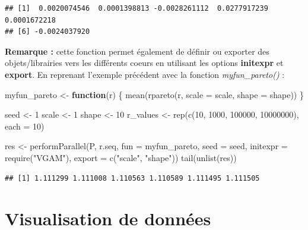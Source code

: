 \documentclass[
]{book}
\newenvironment{Shaded}{\begin{snugshade}}{\end{snugshade}}
\newcommand{\AttributeTok}[1]{\textcolor[rgb]{0.77,0.63,0.00}{#1}}
\newcommand{\ControlFlowTok}[1]{\textcolor[rgb]{0.13,0.29,0.53}{\textbf{#1}}}
\newcommand{\DecValTok}[1]{\textcolor[rgb]{0.00,0.00,0.81}{#1}}
\newcommand{\FunctionTok}[1]{\textcolor[rgb]{0.00,0.00,0.00}{#1}}
\newcommand{\NormalTok}[1]{#1}
\newcommand{\OtherTok}[1]{\textcolor[rgb]{0.56,0.35,0.01}{#1}}
\newcommand{\StringTok}[1]{\textcolor[rgb]{0.31,0.60,0.02}{#1}}
\theoremstyle{definition}
\theoremstyle{definition}
\theoremstyle{definition}
\theoremstyle{definition}
\theoremstyle{remark}
\begin{document}
\begin{verbatim}
## [1]  0.0020074546  0.0001398813 -0.0028261112  0.0277917239  0.0001672218
## [6] -0.0024037920
\end{verbatim}

\textbf{Remarque :} cette fonction permet également de définir ou exporter des objets/librairies vers les différents coeurs en utilisant les options \textbf{initexpr} et \textbf{export}. En reprenant l'exemple précédent avec la fonction \emph{myfun\_pareto()} :

\begin{Shaded}
\begin{Highlighting}[]
\NormalTok{myfun\_pareto }\OtherTok{\textless{}{-}} \ControlFlowTok{function}\NormalTok{(r) \{}
  \FunctionTok{mean}\NormalTok{(}\FunctionTok{rpareto}\NormalTok{(r, }\AttributeTok{scale =}\NormalTok{ scale, }\AttributeTok{shape =}\NormalTok{ shape))}
\NormalTok{\}}

\NormalTok{seed }\OtherTok{\textless{}{-}} \DecValTok{1}
\NormalTok{scale }\OtherTok{\textless{}{-}} \DecValTok{1}
\NormalTok{shape }\OtherTok{\textless{}{-}} \DecValTok{10}
\NormalTok{r\_values }\OtherTok{\textless{}{-}} \FunctionTok{rep}\NormalTok{(}\FunctionTok{c}\NormalTok{(}\DecValTok{10}\NormalTok{, }\DecValTok{1000}\NormalTok{, }\DecValTok{100000}\NormalTok{, }\DecValTok{10000000}\NormalTok{), }\AttributeTok{each =} \DecValTok{10}\NormalTok{)}

\NormalTok{res }\OtherTok{\textless{}{-}} \FunctionTok{performParallel}\NormalTok{(P, r.seq, }\AttributeTok{fun =}\NormalTok{ myfun\_pareto, }
                \AttributeTok{seed =}\NormalTok{ seed,}
                \AttributeTok{initexpr =} \FunctionTok{require}\NormalTok{(}\StringTok{"VGAM"}\NormalTok{),}
                \AttributeTok{export =} \FunctionTok{c}\NormalTok{(}\StringTok{"scale"}\NormalTok{, }\StringTok{"shape"}\NormalTok{))}
\FunctionTok{tail}\NormalTok{(}\FunctionTok{unlist}\NormalTok{(res))}
\end{Highlighting}
\end{Shaded}

\begin{verbatim}
## [1] 1.111299 1.111008 1.110563 1.110589 1.111495 1.111505
\end{verbatim}

\hypertarget{visualisation-de-donnuxe9es}{%
\chapter{Visualisation de données}\label{visualisation-de-donnuxe9es}}
\end{document}
